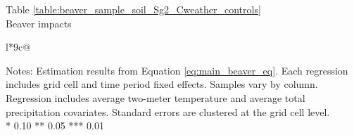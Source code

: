 \begin{table}[htb]
\captionlistentry[table]{}
\label{table:beaver_sample_soil_Sg2_Cweather_controls}
\centering
Table \ref{table:beaver_sample_soil_Sg2_Cweather_controls} \\
Beaver impacts \\
\begin{threeparttable}
\begin{tabulary}{\textwidth}{l*{9}{c}@{}}
\toprule \toprule
\noalign{\smallskip}
\noalign{\smallskip}
\midrule \bottomrule
\end{tabulary}
\medskip
\begin{tablenotes}[flushleft]
\setlength{}
\item
\footnotesize
\justify
Notes: Estimation results from Equation \eqref{eq:main_beaver_eq}.
Each regression includes grid cell and time period fixed effects.
Samples vary by column. Regression includes average two-meter temperature and average total precipitation covariates.
Standard errors are clustered at the grid cell level. \\
\mbox{*} 0.10 ** 0.05 *** 0.01
\end{tablenotes}
\end{threeparttable}
\end{table}
